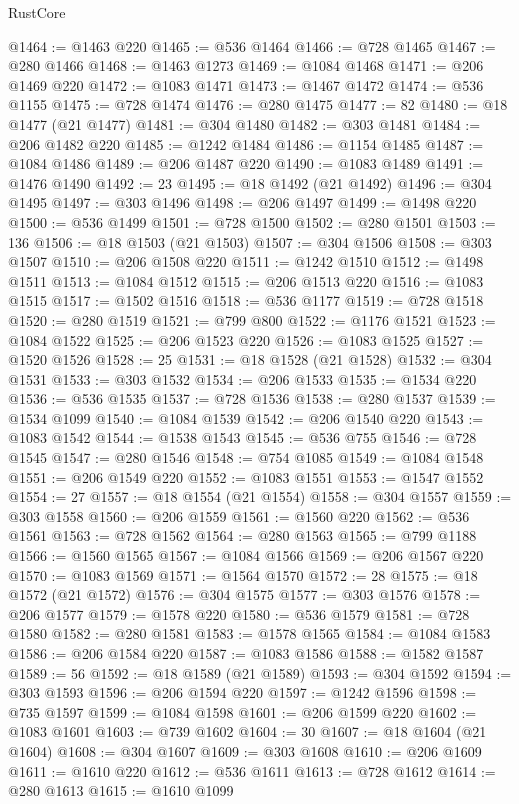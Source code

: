 \begin{lexlean}{RustCore}
\begin{coremodule}
@1464 := @1463 @220
@1465 := @536 @1464
@1466 := @728 @1465
@1467 := @280 @1466
@1468 := @1463 @1273
@1469 := @1084 @1468
@1471 := @206 @1469 @220
@1472 := @1083 @1471
@1473 := @1467 @1472
@1474 := @536 @1155
@1475 := @728 @1474
@1476 := @280 @1475
@1477 := 82
@1480 := @18 @1477 (@21 @1477)
@1481 := @304 @1480
@1482 := @303 @1481
@1484 := @206 @1482 @220
@1485 := @1242 @1484
@1486 := @1154 @1485
@1487 := @1084 @1486
@1489 := @206 @1487 @220
@1490 := @1083 @1489
@1491 := @1476 @1490
@1492 := 23
@1495 := @18 @1492 (@21 @1492)
@1496 := @304 @1495
@1497 := @303 @1496
@1498 := @206 @1497
@1499 := @1498 @220
@1500 := @536 @1499
@1501 := @728 @1500
@1502 := @280 @1501
@1503 := 136
@1506 := @18 @1503 (@21 @1503)
@1507 := @304 @1506
@1508 := @303 @1507
@1510 := @206 @1508 @220
@1511 := @1242 @1510
@1512 := @1498 @1511
@1513 := @1084 @1512
@1515 := @206 @1513 @220
@1516 := @1083 @1515
@1517 := @1502 @1516
@1518 := @536 @1177
@1519 := @728 @1518
@1520 := @280 @1519
@1521 := @799 @800
@1522 := @1176 @1521
@1523 := @1084 @1522
@1525 := @206 @1523 @220
@1526 := @1083 @1525
@1527 := @1520 @1526
@1528 := 25
@1531 := @18 @1528 (@21 @1528)
@1532 := @304 @1531
@1533 := @303 @1532
@1534 := @206 @1533
@1535 := @1534 @220
@1536 := @536 @1535
@1537 := @728 @1536
@1538 := @280 @1537
@1539 := @1534 @1099
@1540 := @1084 @1539
@1542 := @206 @1540 @220
@1543 := @1083 @1542
@1544 := @1538 @1543
@1545 := @536 @755
@1546 := @728 @1545
@1547 := @280 @1546
@1548 := @754 @1085
@1549 := @1084 @1548
@1551 := @206 @1549 @220
@1552 := @1083 @1551
@1553 := @1547 @1552
@1554 := 27
@1557 := @18 @1554 (@21 @1554)
@1558 := @304 @1557
@1559 := @303 @1558
@1560 := @206 @1559
@1561 := @1560 @220
@1562 := @536 @1561
@1563 := @728 @1562
@1564 := @280 @1563
@1565 := @799 @1188
@1566 := @1560 @1565
@1567 := @1084 @1566
@1569 := @206 @1567 @220
@1570 := @1083 @1569
@1571 := @1564 @1570
@1572 := 28
@1575 := @18 @1572 (@21 @1572)
@1576 := @304 @1575
@1577 := @303 @1576
@1578 := @206 @1577
@1579 := @1578 @220
@1580 := @536 @1579
@1581 := @728 @1580
@1582 := @280 @1581
@1583 := @1578 @1565
@1584 := @1084 @1583
@1586 := @206 @1584 @220
@1587 := @1083 @1586
@1588 := @1582 @1587
@1589 := 56
@1592 := @18 @1589 (@21 @1589)
@1593 := @304 @1592
@1594 := @303 @1593
@1596 := @206 @1594 @220
@1597 := @1242 @1596
@1598 := @735 @1597
@1599 := @1084 @1598
@1601 := @206 @1599 @220
@1602 := @1083 @1601
@1603 := @739 @1602
@1604 := 30
@1607 := @18 @1604 (@21 @1604)
@1608 := @304 @1607
@1609 := @303 @1608
@1610 := @206 @1609
@1611 := @1610 @220
@1612 := @536 @1611
@1613 := @728 @1612
@1614 := @280 @1613
@1615 := @1610 @1099

\end{coremodule}
\end{lexlean}

